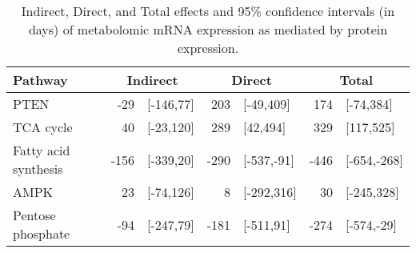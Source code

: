 \begin{table}[ht]
\centering
\begin{tabular}{lrlrlrl}
  \hline
  Pathway & \multicolumn{2}{c}{Indirect} & \multicolumn{2}{c}{Direct}  & \multicolumn{2}{c}{Total} \\
 \hline
PTEN & -29 & [-146,77] & 203 & [-49,409] & 174 & [-74,384] \\ 
  TCA cycle & 40 & [-23,120] & 289 & [42,494] & 329 & [117,525] \\ 
  Fatty acid synthesis & -156 & [-339,20] & -290 & [-537,-91] & -446 & [-654,-268] \\ 
  AMPK & 23 & [-74,126] & 8 & [-292,316] & 30 & [-245,328] \\ 
  Pentose phosphate & -94 & [-247,79] & -181 & [-511,91] & -274 & [-574,-29] \\ 
   \hline
\end{tabular}
\caption{Indirect, Direct, and Total effects and 95\% confidence intervals (in days) of metabolomic mRNA expression as mediated by protein expression.\label{tab:tcga_results}} 
\end{table}
